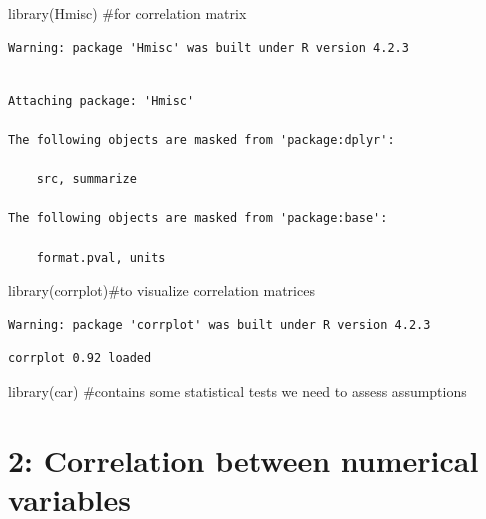 \documentclass[
  letterpaper,
  DIV=11,
  numbers=noendperiod]{scrartcl}
\newenvironment{Shaded}{\begin{snugshade}}{\end{snugshade}}
\newcommand{\CommentTok}[1]{\textcolor[rgb]{0.37,0.37,0.37}{#1}}
\newcommand{\FunctionTok}[1]{\textcolor[rgb]{0.28,0.35,0.67}{#1}}
\newcommand{\NormalTok}[1]{\textcolor[rgb]{0.00,0.23,0.31}{#1}}
\begin{document}
\begin{Shaded}
\begin{Highlighting}[]
\FunctionTok{library}\NormalTok{(Hmisc) }\CommentTok{\#for correlation matrix}
\end{Highlighting}
\end{Shaded}

\begin{verbatim}
Warning: package 'Hmisc' was built under R version 4.2.3
\end{verbatim}

\begin{verbatim}

Attaching package: 'Hmisc'

The following objects are masked from 'package:dplyr':

    src, summarize

The following objects are masked from 'package:base':

    format.pval, units
\end{verbatim}

\begin{Shaded}
\begin{Highlighting}[]
\FunctionTok{library}\NormalTok{(corrplot)}\CommentTok{\#to visualize correlation matrices}
\end{Highlighting}
\end{Shaded}

\begin{verbatim}
Warning: package 'corrplot' was built under R version 4.2.3
\end{verbatim}

\begin{verbatim}
corrplot 0.92 loaded
\end{verbatim}

\begin{Shaded}
\begin{Highlighting}[]
\FunctionTok{library}\NormalTok{(car) }\CommentTok{\#contains some statistical tests we need to assess assumptions}
\end{Highlighting}
\end{Shaded}

\hypertarget{correlation-between-numerical-variables}{%
\section{\texorpdfstring{\textbf{2: Correlation between numerical
variables}}{2: Correlation between numerical variables}}\label{correlation-between-numerical-variables}}
\end{document}
